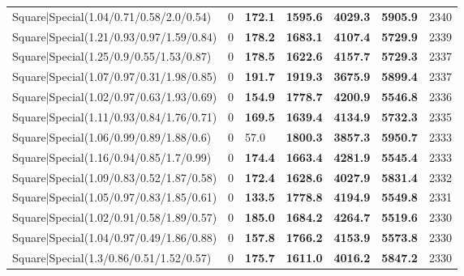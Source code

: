\begin{tabular}{lrllllr}
 Square|Special(1.04/0.71/0.58/2.0/0.54)                       &             0   & \textbf{172.1} & \textbf{1595.6} & \textbf{4029.3} & \textbf{5905.9} &         2340 \\
 Square|Special(1.21/0.93/0.97/1.59/0.84)                      &             0   & \textbf{178.2} & \textbf{1683.1} & \textbf{4107.4} & \textbf{5729.9} &         2339 \\
 Square|Special(1.25/0.9/0.55/1.53/0.87)                       &             0   & \textbf{178.5} & \textbf{1622.6} & \textbf{4157.7} & \textbf{5729.3} &         2337 \\
 Square|Special(1.07/0.97/0.31/1.98/0.85)                      &             0   & \textbf{191.7} & \textbf{1919.3} & \textbf{3675.9} & \textbf{5899.4} &         2337 \\
 Square|Special(1.02/0.97/0.63/1.93/0.69)                      &             0   & \textbf{154.9} & \textbf{1778.7} & \textbf{4200.9} & \textbf{5546.8} &         2336 \\
 Square|Special(1.11/0.93/0.84/1.76/0.71)                      &             0   & \textbf{169.5} & \textbf{1639.4} & \textbf{4134.9} & \textbf{5732.3} &         2335 \\
 Square|Special(1.06/0.99/0.89/1.88/0.6)                       &             0   & 57.0           & \textbf{1800.3} & \textbf{3857.3} & \textbf{5950.7} &         2333 \\
 Square|Special(1.16/0.94/0.85/1.7/0.99)                       &             0   & \textbf{174.4} & \textbf{1663.4} & \textbf{4281.9} & \textbf{5545.4} &         2333 \\
 Square|Special(1.09/0.83/0.52/1.87/0.58)                      &             0   & \textbf{172.4} & \textbf{1628.6} & \textbf{4027.9} & \textbf{5831.4} &         2332 \\
 Square|Special(1.05/0.97/0.83/1.85/0.61)                      &             0   & \textbf{133.5} & \textbf{1778.8} & \textbf{4194.9} & \textbf{5549.8} &         2331 \\
 Square|Special(1.02/0.91/0.58/1.89/0.57)                      &             0   & \textbf{185.0} & \textbf{1684.2} & \textbf{4264.7} & \textbf{5519.6} &         2330 \\
 Square|Special(1.04/0.97/0.49/1.86/0.88)                      &             0   & \textbf{157.8} & \textbf{1766.2} & \textbf{4153.9} & \textbf{5573.8} &         2330 \\
 Square|Special(1.3/0.86/0.51/1.52/0.57)                       &             0   & \textbf{175.7} & \textbf{1611.0} & \textbf{4016.2} & \textbf{5847.2} &         2330 \\

\end{tabular}
